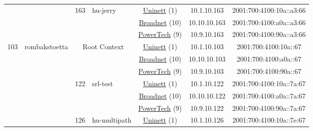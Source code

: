 \begin{small}
\begin{center}
\begin{longtable}{|c|c|c|c|c|c|c|c|}
  &  & \multirow{3}{*}{\tiny{163}} & \multicolumn{1}{|l|}{\multirow{3}{*}{\tiny{hu-jerry}}} & \multicolumn{2}{|c|}{\tiny{\href{https://www.uninett.no}{Uninett} (1)}} & \tiny{10.1.10.163} & \tiny{2001:700:4100:10a::a3:66} \\* \cline{5-5}\cline{6-6}\cline{7-7}\cline{8-8}
  &  &  &  & \multicolumn{2}{|c|}{\tiny{\href{https://www.broadnet.no}{Broadnet} (10)}} & \tiny{10.10.10.163} & \tiny{2001:700:4100:a0a::a3:66} \\* \cline{5-5}\cline{6-6}\cline{7-7}\cline{8-8}
  &  &  &  & \multicolumn{2}{|c|}{\tiny{\href{http://www.powertech.no}{PowerTech} (9)}} & \tiny{10.9.10.163} & \tiny{2001:700:4100:90a::a3:66} \\ \hline
 \multirow{33}{*}{\tiny{103}} & \multicolumn{1}{|l|}{\multirow{33}{*}{\tiny{rombakstoetta}}} & \multicolumn{2}{|c|}{\multirow{3}{*}{\tiny{Root Context}}} & \multicolumn{2}{|c|}{\tiny{\href{https://www.uninett.no}{Uninett} (1)}} & \tiny{10.1.10.103} & \tiny{2001:700:4100:10a::67} \\* \cline{5-5}\cline{6-6}\cline{7-7}\cline{8-8}
  &  & \multicolumn{2}{|c|}{} & \multicolumn{2}{|c|}{\tiny{\href{https://www.broadnet.no}{Broadnet} (10)}} & \tiny{10.10.10.103} & \tiny{2001:700:4100:a0a::67} \\* \cline{5-5}\cline{6-6}\cline{7-7}\cline{8-8}
  &  & \multicolumn{2}{|c|}{} & \multicolumn{2}{|c|}{\tiny{\href{http://www.powertech.no}{PowerTech} (9)}} & \tiny{10.9.10.103} & \tiny{2001:700:4100:90a::67} \\* \cline{3-3}\cline{4-4}\cline{5-5}\cline{6-6}\cline{7-7}\cline{8-8}
  &  & \multirow{3}{*}{\tiny{122}} & \multicolumn{1}{|l|}{\multirow{3}{*}{\tiny{srl-test}}} & \multicolumn{2}{|c|}{\tiny{\href{https://www.uninett.no}{Uninett} (1)}} & \tiny{10.1.10.122} & \tiny{2001:700:4100:10a::7a:67} \\* \cline{5-5}\cline{6-6}\cline{7-7}\cline{8-8}
  &  &  &  & \multicolumn{2}{|c|}{\tiny{\href{https://www.broadnet.no}{Broadnet} (10)}} & \tiny{10.10.10.122} & \tiny{2001:700:4100:a0a::7a:67} \\* \cline{5-5}\cline{6-6}\cline{7-7}\cline{8-8}
  &  &  &  & \multicolumn{2}{|c|}{\tiny{\href{http://www.powertech.no}{PowerTech} (9)}} & \tiny{10.9.10.122} & \tiny{2001:700:4100:90a::7a:67} \\* \cline{3-3}\cline{4-4}\cline{5-5}\cline{6-6}\cline{7-7}\cline{8-8}
  &  & \multirow{3}{*}{\tiny{126}} & \multicolumn{1}{|l|}{\multirow{3}{*}{\tiny{hu-multipath}}} & \multicolumn{2}{|c|}{\tiny{\href{https://www.uninett.no}{Uninett} (1)}} & \tiny{10.1.10.126} & \tiny{2001:700:4100:10a::7e:67} \\* \cline{5-5}\cline{6-6}\cline{7-7}\cline{8-8}

\end{longtable}
\end{center}
\end{small}
